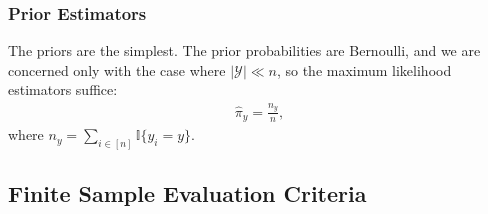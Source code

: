 \documentclass[10pt,journal,cspaper,compsoc]{IEEEtran}
\newcommand{\II}{\mathbb{I}}           %
\providecommand{\mc}[1]{\mathcal{#1}}
\providecommand{\mh}[1]{\hat{#1}}
\providecommand{\mt}[1]{\widetilde{#1}}
\begin{document}




\subsubsection{Prior Estimators} %
\label{sub:prior_estimators}

The priors are the simplest.  The prior probabilities are Bernoulli, and we are concerned only with the case where $|\mc{Y}| \ll n$, so the maximum likelihood estimators suffice:
\begin{align}
\mh{\pi}_y = \frac{n_y}{n},
\end{align}
where $n_y=\sum_{i \in [n]} \II\{y_i = y\}$.



\subsection{Finite Sample Evaluation Criteria} %
\label{sub:evaluation_criteria}
\end{document}
